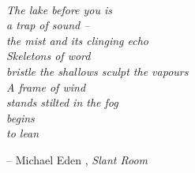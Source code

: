 \cleardoublepage\newpage
\thispagestyle{empty}

\phantom{~}\\[2em]
\textit{
\noindent\phantom{~~~~~~~~~~~~~~~}The lake before you is\\
 \phantom{~~~~~~~~~~~~~~~}a trap of sound --\\
 \phantom{~~~~~~~~~~~~~~~}the mist and its clinging echo\\
 \phantom{~~~~~~~~~~~~~~~~~~~~~~~~~~~} Skeletons of word\\
 \phantom{~~~~~~~~~~~~~~~} bristle the shallows\phantom{~~~} sculpt the vapours\\[1em]
 \phantom{~~~~~~~~~~~~~~~}A frame of wind\\
 \phantom{~~~~~~~~~~~~~~~}stands stilted in the fog\\[1em]
 \phantom{~~~~~~~~~~~~~~~}begins\\[2em]
 \phantom{~~~~~~~~~~~~~~~~~~~~~~~~~~~} to lean
}

\vfill

\begin{flushright}
-- Michael Eden \citeauthor{Reynolds2009}, \textsl{Slant Room}\\[3em]
\end{flushright}

\newpage
